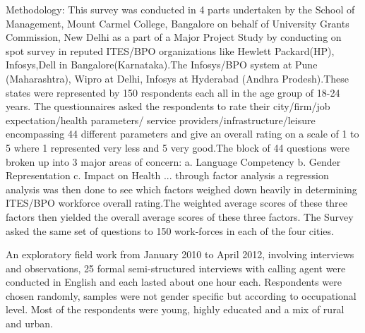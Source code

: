Methodology:
This survey was conducted in 4 parts undertaken by the School of Management, Mount Carmel College, Bangalore on behalf of University Grants Commission, New Delhi as a part of a Major  Project Study by conducting on spot survey in reputed ITES/BPO organizations like Hewlett Packard(HP), Infosys,Dell in Bangalore(Karnataka).The Infosys/BPO system at Pune (Maharashtra), Wipro at Delhi, Infosys at Hyderabad (Andhra Prodesh).These states were represented by 150 respondents each all in the age group of 18-24 years. The questionnaires asked the respondents to rate their city/firm/job expectation/health parameters/ service providers/infrastructure/leisure encompassing 44 different parameters and give an overall rating on a scale of 1 to 5 where 1 represented very less and 5 very good.The block of 44 questions were broken up into 3 major areas of concern:
a. Language Competency
b. Gender Representation
c. Impact on Health
... through factor analysis a regression analysis was then done to see which factors weighed down heavily in determining ITES/BPO workforce overall rating.The weighted average scores of these three factors then yielded the overall average scores of these three factors. The Survey asked the same set of questions to 150 work-forces in each of the four cities.

An exploratory field work  from January 2010 to April 2012, involving interviews and observations, 25 formal semi-structured interviews with calling agent were conducted in English and each lasted about one hour each. Respondents were chosen randomly, samples were not gender specific but according to occupational level. Most of the respondents were young, highly educated and a mix of rural and urban.